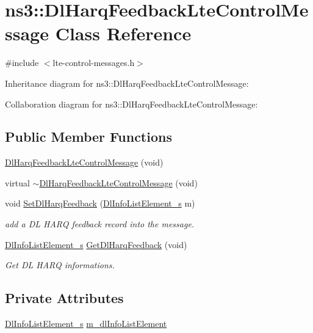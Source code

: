 \hypertarget{classns3_1_1DlHarqFeedbackLteControlMessage}{}\section{ns3\+:\+:Dl\+Harq\+Feedback\+Lte\+Control\+Message Class Reference}
\label{classns3_1_1DlHarqFeedbackLteControlMessage}


{\ttfamily \#include $<$lte-\/control-\/messages.\+h$>$}



Inheritance diagram for ns3\+:\+:Dl\+Harq\+Feedback\+Lte\+Control\+Message\+:


Collaboration diagram for ns3\+:\+:Dl\+Harq\+Feedback\+Lte\+Control\+Message\+:
\subsection*{Public Member Functions}
\begin{DoxyCompactItemize}
\item 
\hyperlink{classns3_1_1DlHarqFeedbackLteControlMessage_a641e634bd381c9056225eff7c85196bb}{Dl\+Harq\+Feedback\+Lte\+Control\+Message} (void)
\item 
virtual \hyperlink{classns3_1_1DlHarqFeedbackLteControlMessage_a104a4837554d91070d6dbf9e075ea53a}{$\sim$\+Dl\+Harq\+Feedback\+Lte\+Control\+Message} (void)
\item 
void \hyperlink{classns3_1_1DlHarqFeedbackLteControlMessage_a5b31225ff5d9d787bc2085042fb14b74}{Set\+Dl\+Harq\+Feedback} (\hyperlink{structns3_1_1DlInfoListElement__s}{Dl\+Info\+List\+Element\+\_\+s} m)
\begin{DoxyCompactList}\small\item\em add a DL H\+A\+RQ feedback record into the message. \end{DoxyCompactList}\item 
\hyperlink{structns3_1_1DlInfoListElement__s}{Dl\+Info\+List\+Element\+\_\+s} \hyperlink{classns3_1_1DlHarqFeedbackLteControlMessage_ad3052b809440f42e8b0541fbbe756ff8}{Get\+Dl\+Harq\+Feedback} (void)
\begin{DoxyCompactList}\small\item\em Get DL H\+A\+RQ informations. \end{DoxyCompactList}\end{DoxyCompactItemize}
\subsection*{Private Attributes}
\begin{DoxyCompactItemize}
\item 
\hyperlink{structns3_1_1DlInfoListElement__s}{Dl\+Info\+List\+Element\+\_\+s} \hyperlink{classns3_1_1DlHarqFeedbackLteControlMessage_ac6b2a3bb27c420462d953eab0c847ae7}{m\+\_\+dl\+Info\+List\+Element}
\end{DoxyCompactItemize}
